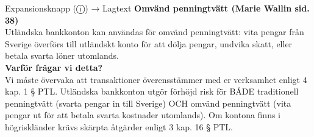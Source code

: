 \documentclass[10pt]{beamer}
\begin{document}
\begin{frame}[label=riskfragor-steg2]
\begin{alertblock}{Expansionsknapp (ⓘ) → Lagtext}
    \tiny \textbf{Omvänd penningtvätt (Marie Wallin sid. 38)}\\
    \tiny Utländska bankkonton kan användas för omvänd penningtvätt: vita pengar från Sverige överförs
    till utländskt konto för att dölja pengar, undvika skatt, eller betala svarta löner utomlands.\\[0.1cm]
    
    \tiny \textbf{Varför frågar vi detta?}\\
    \tiny Vi måste övervaka att transaktioner överensstämmer med er verksamhet enligt 4 kap. 1 § PTL.
    Utländska bankkonton utgör förhöjd risk för BÅDE traditionell penningtvätt (svarta pengar in till Sverige)
    OCH omvänd penningtvätt (vita pengar ut för att betala svarta kostnader utomlands). Om kontona finns
    i högriskländer krävs skärpta åtgärder enligt 3 kap. 16 § PTL.
  \end{alertblock}

  \vspace{0.5cm}
  \begin{flushright}
    \hyperlink{riskfragor-steg1}{} \hspace{0.3cm} \hyperlink{riskfragor-steg3}{}
  \end{flushright}
\end{frame}

\end{document}
